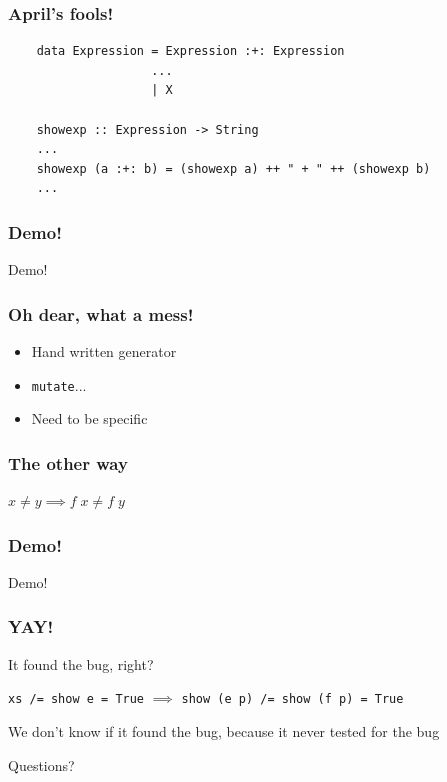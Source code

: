 \documentclass{beamer}
\begin{document}
\begin{frame}[fragile]
    \frametitle{April's fools!}
    \begin{verbatim}
    data Expression = Expression :+: Expression
                    ...
                    | X

    showexp :: Expression -> String
    ...
    showexp (a :+: b) = (showexp a) ++ " + " ++ (showexp b)
    ...
    \end{verbatim}
\end{frame}

\begin{frame}
    \frametitle{Demo!}
        \Huge{\centerline{Demo!}}
\end{frame}

\begin{frame}
    \frametitle{Oh dear, what a mess!}
    \begin{itemize}
        \item Hand written generator
        \item \texttt{mutate}...
        \item Need to be specific
    \end{itemize}
\end{frame}

\begin{frame}
    \frametitle{The other way}
    \centerline{$x \neq y \implies f\;x\neq f\;y$} 
\end{frame}

\begin{frame}
    \frametitle{Demo!}
        \Huge{\centerline{Demo!}}
\end{frame}

\begin{frame}
    \frametitle{YAY!}
    \centerline{It found the bug, right?}
    \pause
    \centerline{}
    \centerline{\texttt{xs /= show e = True} $\implies$ \texttt{show (e p) /= show (f p) = True}}
    \centerline{}
    \centerline{We don't know if it found the bug, because it never tested for the bug}
\end{frame}

\begin{frame}
    \Huge{\centerline{Questions?}}
\end{frame}
\end{document}

